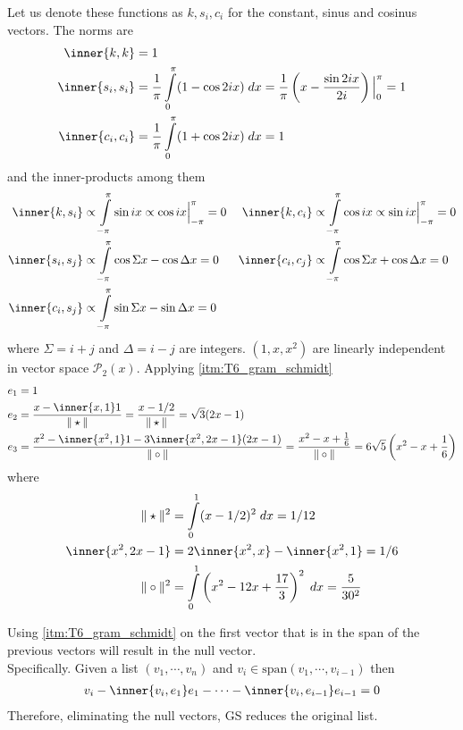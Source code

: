 \exo{} Let us denote these functions as $k, s_i, c_i$ for the constant, sinus and cosinus vectors. The norms are \begin{align*}
\inner{k,k}&= 1 \\
\inner{s_i,s_i} &= \frac{1}{\pi}\int\limits_0^{\pi}(1 - \cos{2ix})\;dx = \frac{1}{\pi}\left( x - \frac{\sin{2ix}}{2i}\right)\Big|_0^\pi = 1 \\
\inner{c_i,c_i} &=\frac{1}{\pi}\int\limits_0^{\pi}(1 + \cos{2ix})\;dx = 1
\end{align*}
and the inner-products among them
\begin{align*}
\inner{k,s_i}&\propto \int\limits_{-\pi}^\pi \sin{ix}\propto \cos{ix}\Big|_{-\pi}^\pi = 0 &
\inner{k,c_i}&\propto \int\limits_{-\pi}^\pi \cos{ix} \propto \sin{ix}\Big|_{-\pi}^\pi= 0 \\
\inner{s_i,s_j}&\propto \int\limits_{-\pi}^\pi \cos{\Sigma x} - \cos{\Delta x}   = 0&
\inner{c_i,c_j}&\propto \int\limits_{-\pi}^\pi \cos{\Sigma x} + \cos{\Delta x}  = 0\\
\inner{c_i,s_j}& \propto \int\limits_{-\pi}^\pi \sin{\Sigma x} - \sin{\Delta x} = 0 
\end{align*}
where $\Sigma = i+j$ and $\Delta = i-j$ are integers.
\exo{} $(1,x,x^2)$ are linearly independent in vector space $\mathcal{P}_2(x)$. Applying \ref{itm:T6_gram_schmidt}
\begin{align*}
e_1 &= 1 \\
e_2 &= \frac{x - \inner{x,1} 1 }{\|\star\|} =  \frac{x - 1/2 }{\|\star\|} = \sqrt{3}(2x - 1) \\
e_3 &= \frac{x^2 - \inner{x^2,1} 1 - 3\inner{x^2,2x - 1}(2x - 1)}{\|\circ\|} = \frac{x^{2} - x + \frac{1}{6}}{\|\circ\|} = 6 \sqrt{5} \left(x^{2} - x + \frac{1}{6}\right)
\end{align*}
where
\begin{align*}
\|\star\|^2 &= \int\limits_0^1(x - 1/2)^2\;dx = 1/12 \\
\inner{x^2,2x-1} &= 2\inner{x^2,x} - \inner{x^2,1} = 1/6 \\
\|\circ\|^2 &= \int\limits_0^1\left( x^{2} - 12 x + \frac{17}{3}\right)^2\;dx = \frac{5}{30^2}
\end{align*}


\exo{} Using \eqref{itm:T6_gram_schmidt} on the first vector that is in the span of the previous vectors will result in the null vector. \\
Specifically. Given a list $(v_1,\cdots, v_n)$ and $v_i \in\mathrm{span}{(v_1,\cdots, v_{i-1})}$ then
\begin{align*}
v_i -\inner{v_i,e_1}e_1 - \cdots -\inner{v_i,e_{i-1}}e_{i-1} = 0 
\end{align*}
Therefore, eliminating the null vectors, GS reduces the original list.

